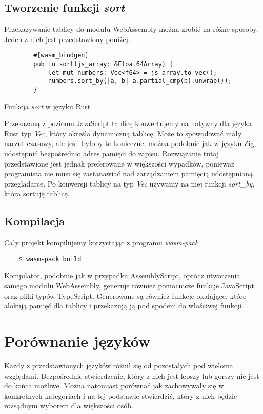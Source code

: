 \documentclass[language=polish,type=master]{aghmodern}
\begin{document}
\subsection{Tworzenie funkcji \emph{sort}}
Przekazywanie tablicy do modułu WebAssembly można zrobić na różne sposoby.
Jeden z nich jest przedstawiony poniżej.

\begin{listing}[H]
    \begin{verbatim}
        #[wasm_bindgen]
        pub fn sort(js_array: &Float64Array) {
            let mut numbers: Vec<f64> = js_array.to_vec();
            numbers.sort_by(|a, b| a.partial_cmp(b).unwrap());
        }
    \end{verbatim}
    \caption{Funkcja \emph{sort} w języku Rust}
\end{listing}

Przekazaną z poziomu JavaScript tablicę konwertujemy na natywny dla języka Rust typ \emph{Vec}, który określa dynamiczną tablicę.
Może to spowodować mały narzut czasowy, ale jeśli byłoby to konieczne, można podobnie jak w języku Zig, udostępnić bezpośrednio adres pamięci do zapisu.
Rozwiązanie tutaj przedstawione jest jednak preferowane w większości wypadków, ponieważ programista nie musi się zastanawiać nad zarządzaniem pamięcią udostępnianą przeglądarce.
Po konwersji tablicy na typ \emph{Vec} używamy na niej funkcji \emph{sort\_by}, która sortuję tablicę.

\subsection{Kompilacja}
Cały projekt kompilujemy korzystając z programu \emph{wasm-pack}.

\begin{verbatim}
    $ wasm-pack build
\end{verbatim}

Kompilator, podobnie jak w przypadku AssemblyScript, oprócz utworzenia samego modułu WebAssembly, generuje również pomocnicze funkcje JavaScript oraz pliki typów TypeScript.
Generowane są również funkcje okalające, które alokują pamięć dla tablicy i przekazują ją pod spodem do właściwej funkcji.

\section{Porównanie języków}
Każdy z przedstawionych języków różnił się od pozostałych pod wieloma względami.
Bezpośrednie stwierdzenie, który z nich jest lepszy lub gorszy nie jest do końca możliwe.
Można natomiast porównać jak zachowywały się w konkretnych kategoriach i na tej podstawie stwierdzić, który z nich będzie rozsądnym wyborem dla większości osób.
\end{document}
